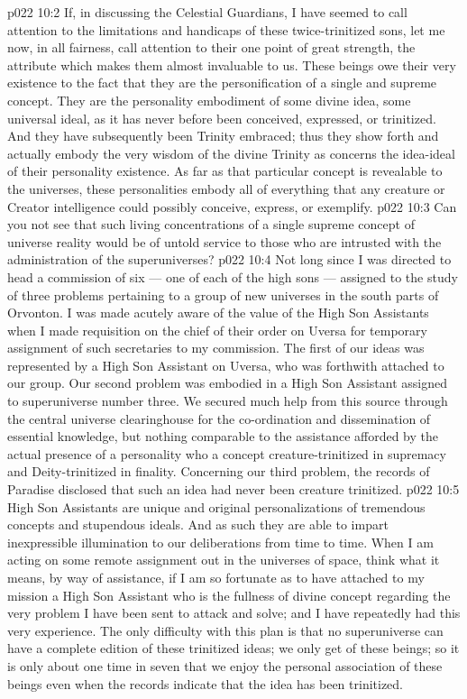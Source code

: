 \vs p022 10:2 \pc If, in discussing the Celestial Guardians, I have seemed to call attention to the limitations and handicaps of these twice\hyp{}trinitized sons, let me now, in all fairness, call attention to their one point of great strength, the attribute which makes them almost invaluable to us. These beings owe their very existence to the fact that they are the personification of a single and supreme concept. They are the personality embodiment of some divine idea, some universal ideal, as it has never before been conceived, expressed, or trinitized. And they have subsequently been Trinity embraced; thus they show forth and actually embody the very wisdom of the divine Trinity as concerns the idea\hyp{}ideal of their personality existence. As far as that particular concept is revealable to the universes, these personalities embody all of everything that any creature or Creator intelligence could possibly conceive, express, or exemplify. 
\vs p022 10:3 Can you not see that such living concentrations of a single supreme concept of universe reality would be of untold service to those who are intrusted with the administration of the superuniverses?
\vs p022 10:4 \pc Not long since I was directed to head a commission of six --- one of each of the high sons --- assigned to the study of three problems pertaining to a group of new universes in the south parts of Orvonton. I was made acutely aware of the value of the High Son Assistants when I made requisition on the chief of their order on Uversa for temporary assignment of such secretaries to my commission. The first of our ideas was represented by a High Son Assistant on Uversa, who was forthwith attached to our group. Our second problem was embodied in a High Son Assistant assigned to superuniverse number three. We secured much help from this source through the central universe clearinghouse for the co\hyp{}ordination and dissemination of essential knowledge, but nothing comparable to the assistance afforded by the actual presence of a personality who  a concept creature\hyp{}trinitized in supremacy and Deity\hyp{}trinitized in finality. Concerning our third problem, the records of Paradise disclosed that such an idea had never been creature trinitized.
\vs p022 10:5 \pc High Son Assistants are unique and original personalizations of tremendous concepts and stupendous ideals. And as such they are able to impart inexpressible illumination to our deliberations from time to time. When I am acting on some remote assignment out in the universes of space, think what it means, by way of assistance, if I am so fortunate as to have attached to my mission a High Son Assistant who is the fullness of divine concept regarding the very problem I have been sent to attack and solve; and I have repeatedly had this very experience. The only difficulty with this plan is that no superuniverse can have a complete edition of these trinitized ideas; we only get  of these beings; so it is only about one time in seven that we enjoy the personal association of these beings even when the records indicate that the idea has been trinitized.
